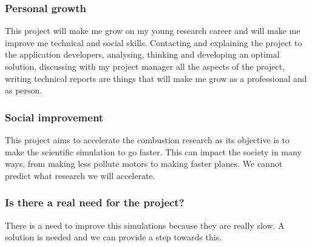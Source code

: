 \subsubsection{Personal growth}

\justify
This project will make me grow on my young research career and will make me improve me technical and social skills. Contacting and explaining the project to the application developers, analysing, thinking and developing an optimal solution, discussing with my project manager all the aspects of the project, writing technical reports are things that will make me grow as a professional and as person.

\subsubsection{Social improvement}

\justify
This project aims to accelerate the combustion research as its objective is to make the scientific simulation to go faster. This can impact the society in many ways, from making less pollute motors to making faster planes. We cannot predict what research we will accelerate. 

\subsubsection{Is there a real need for the project?}

\justify
There is a need to improve this simulations because they are really slow. A solution is needed and we can provide a step towards this. 
